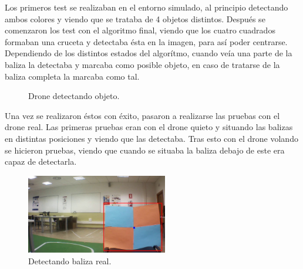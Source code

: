 \hspace{1cm} Los primeros test se realizaban en el entorno simulado, al principio detectando ambos colores y viendo que se trataba de 4 objetos distintos. Despu\'es se comenzaron los test con el algoritmo final, viendo que los cuatro cuadrados formaban una cruceta y detectaba \'esta en la imagen, para as\'i poder centrarse. Dependiendo de los distintos estados del algor\'itmo, cuando ve\'ia una parte de la baliza la detectaba y marcaba como posible objeto, en caso de tratarse de la baliza completa la marcaba como tal. 

\begin{figure}[H]
 \centering
 \caption{Drone detectando objeto.}
 \label{f:Drone detecta objeto. }
\end{figure} 

\hspace{1cm} Una vez se realizaron \'estos con \'exito, pasaron a realizarse las pruebas con el drone real. Las primeras pruebas eran con el drone quieto y situando las balizas en distintas posiciones y viendo que las detectaba. Tras esto con el drone volando se hicieron pruebas, viendo que cuando se situaba la baliza debajo de este era capaz de detectarla. 

\begin{figure}[H]
	\centering
		\includegraphics[width=0.55\textwidth]{imgs/k_beacon21.jpg}
		\caption{Detectando baliza real.}
	\label{fig:Detectando baliza real.}
\end{figure}

